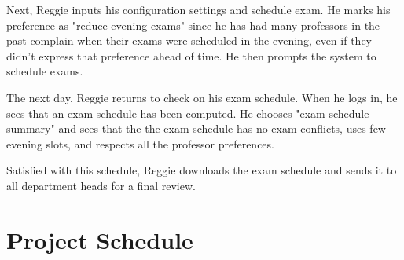 \documentclass[11pt]{article}
\begin{document}
\begin{description}
Next, Reggie inputs his configuration settings and schedule exam.
He marks his preference as "reduce evening exams" since he has had many professors
in the past complain when their exams were scheduled in the evening,
even if they didn't express that preference ahead of time.
He then prompts the system to schedule exams.

The next day, Reggie returns to check on his exam schedule.
When he logs in, he sees that an exam schedule has been computed.
He chooses "exam schedule summary" and sees that
the the exam schedule has no exam conflicts, uses few evening slots,
and respects all the professor preferences.

Satisfied with this schedule, Reggie downloads the exam schedule
 and sends it to all department heads for a final review.


\end{description}

\section{Project Schedule} %
\end{document}
